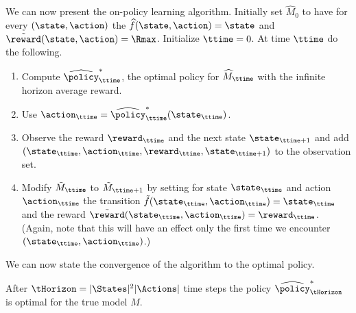 We can now present the on-policy learning algorithm.
%
Initially set $\widehat{M}_0$ to have for every $(\state,\action)$
the $\widehat{f}(\state,\action)=\state$ and
$\tilde{\reward}(\state,\action)=\Rmax$. Initialize $\ttime=0$. At
time $\ttime$ do the following.
\begin{enumerate}
\item
Compute $\widehat{\policy}^*_\ttime$, the optimal policy for
$\widehat{M}_\ttime$ with the infinite horizon average reward.
\item
Use $\action_\ttime=\widehat{\policy}^*_\ttime(\state_{\ttime})$.
\item
Observe the reward $\reward_\ttime$ and the next state
$\state_{\ttime+1}$ and add
$(\state_\ttime,\action_\ttime,\reward_\ttime,\state_{\ttime+1})$ to
the observation set.
\item
Modify $\tilde{M}_\ttime$ to  $\tilde{M}_{\ttime+1}$
by setting for state $\state_\ttime$ and action $\action_\ttime$ the
transition $\tilde{f}(\state_\ttime,\action_\ttime)=\state_\ttime$
and the reward
$\tilde{\reward}(\state_\ttime,\action_\ttime)=\reward_\ttime$.
(Again, note that this will have an effect only the first time we
encounter $(\state_\ttime,\action_\ttime)$.)
%
\end{enumerate}





We can now state the convergence of the algorithm to the optimal
policy.

\begin{theorem}
After $\tHorizon=|\States|^2|\Actions|$ time steps the policy
$\widehat{\policy}^*_\tHorizon$ is optimal for the true model $M$.
\end{theorem}


